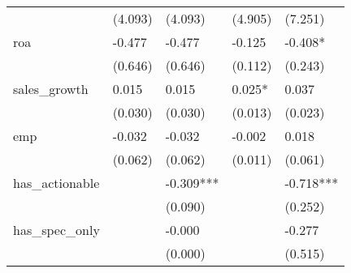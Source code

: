 \begin{table}
\begin{center}
\begin{tabular}{lllll}
                  & (4.093)                                   & (4.093)                                         & (4.905)                                 & (7.251)                                                \\
roa               & -0.477                                    & -0.477                                          & -0.125                                  & -0.408*                                                \\
                  & (0.646)                                   & (0.646)                                         & (0.112)                                 & (0.243)                                                \\
sales\_growth     & 0.015                                     & 0.015                                           & 0.025*                                  & 0.037                                                  \\
                  & (0.030)                                   & (0.030)                                         & (0.013)                                 & (0.023)                                                \\
emp               & -0.032                                    & -0.032                                          & -0.002                                  & 0.018                                                  \\
                  & (0.062)                                   & (0.062)                                         & (0.011)                                 & (0.061)                                                \\
has\_actionable   &                                           & -0.309***                                       &                                         & -0.718***                                              \\
                  &                                           & (0.090)                                         &                                         & (0.252)                                                \\
has\_spec\_only   &                                           & -0.000                                          &                                         & -0.277                                                 \\
                  &                                           & (0.000)                                         &                                         & (0.515)                                                \\

\end{tabular}
\end{center}
\end{table}
